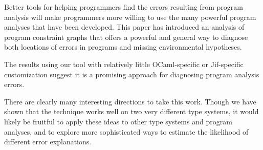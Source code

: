 Better tools for helping programmers find the errors resulting from
program analysis will make programmers more willing to use the many
powerful program analyses that have been developed. This paper has
introduced an analysis of program constraint graphs that offers a
powerful and general way to diagnose both locations of errors in
programs and missing environmental hypotheses.

The results using our tool with relatively little OCaml-specific or
Jif-specific customization suggest it is a promising approach for
diagnosing program analysis errors.

There are clearly many interesting directions to take this work.
Though we have shown that the technique works well on two very
different type systems, it would likely be fruitful to apply these
ideas to other type systems and program analyses, and to explore more
sophisticated ways to estimate the likelihood of different error
explanations.






